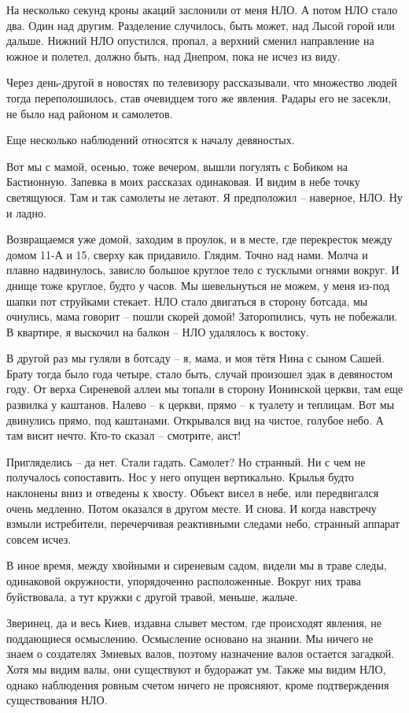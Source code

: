 На несколько секунд кроны акаций заслонили от меня НЛО. А потом НЛО стало два. Один над другим. Разделение случилось, быть может, над Лысой горой или дальше. Нижний НЛО опустился, пропал, а верхний сменил направление на южное и полетел, должно быть, над Днепром, пока не исчез из виду.   

Через день-другой в новостях по телевизору рассказывали, что множество людей тогда переполошилось, став очевидцем того же явления. Радары его не засекли, не было над районом и самолетов.

Еще несколько наблюдений относятся к началу девяностых.

Вот мы с мамой, осенью, тоже вечером, вышли погулять с Бобиком на Бастионную. Запевка в моих рассказах одинаковая. И видим в небе точку светящуюся. Там и так самолеты не летают. Я предположил – наверное, НЛО. Ну и ладно.

Возвращаемся уже домой, заходим в проулок, и в месте, где перекресток между домом 11-А и 15, сверху как придавило. Глядим. Точно над нами. Молча и плавно надвинулось, зависло большое круглое тело с тусклыми огнями вокруг. И днище тоже круглое, будто у часов. Мы шевельнуться не можем, у меня из-под шапки пот струйками стекает. НЛО стало двигаться в сторону ботсада, мы очнулись, мама говорит – пошли скорей домой! Заторопились, чуть не побежали. В квартире, я выскочил на балкон – НЛО удалялось к востоку.

В другой раз мы гуляли в ботсаду – я, мама, и моя тётя Нина с сыном Сашей. Брату тогда было года четыре, стало быть, случай произошел эдак в девяностом году. От верха Сиреневой аллеи мы топали в сторону Ионинской церкви, там еще развилка у каштанов. Налево – к церкви, прямо – к туалету и теплицам. Вот мы двинулись прямо, под каштанами. Открывался вид на чистое, голубое небо. А там висит нечто. Кто-то сказал – смотрите, аист!

Пригляделись – да нет. Стали гадать. Самолет? Но странный. Ни с чем не получалось сопоставить. Нос у него опущен вертикально. Крылья будто наклонены вниз и отведены к хвосту. Объект висел в небе, или передвигался очень медленно. Потом оказался в другом месте. И снова. И когда навстречу взмыли истребители, перечерчивая реактивными следами небо, странный аппарат совсем исчез.

В иное время, между хвойными и сиреневым садом, видели мы в траве следы, одинаковой окружности, упорядоченно расположенные. Вокруг них трава буйствовала, а тут кружки с другой травой, меньше, жальче.

Зверинец, да и весь Киев, издавна слывет местом, где происходят явления, не поддающиеся осмыслению. Осмысление основано на знании. Мы ничего не знаем о создателях Змиевых валов, поэтому назначение валов остается загадкой. Хотя мы видим валы, они существуют и будоражат ум. Также мы видим НЛО, однако наблюдения ровным счетом ничего не проясняют, кроме подтверждения существования НЛО.

